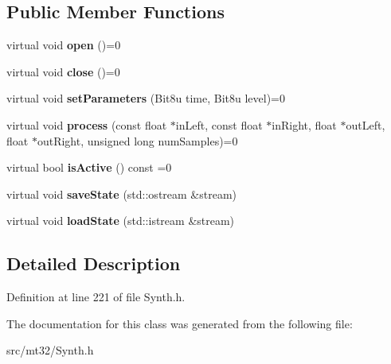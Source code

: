 \subsection*{Public Member Functions}
\begin{DoxyCompactItemize}
\item 
\hypertarget{classMT32Emu_1_1ReverbModel_aaa148cc0e88fc6bff6711e0f7d88f53f}{virtual void {\bfseries open} ()=0}\label{classMT32Emu_1_1ReverbModel_aaa148cc0e88fc6bff6711e0f7d88f53f}

\item 
\hypertarget{classMT32Emu_1_1ReverbModel_ac28466ba2693e477199460f4e8284a18}{virtual void {\bfseries close} ()=0}\label{classMT32Emu_1_1ReverbModel_ac28466ba2693e477199460f4e8284a18}

\item 
\hypertarget{classMT32Emu_1_1ReverbModel_a93c9359642d5af0d12919a9c401cd45b}{virtual void {\bfseries set\-Parameters} (Bit8u time, Bit8u level)=0}\label{classMT32Emu_1_1ReverbModel_a93c9359642d5af0d12919a9c401cd45b}

\item 
\hypertarget{classMT32Emu_1_1ReverbModel_ac60ff1ce2509fe736e1ec16ce0ffd680}{virtual void {\bfseries process} (const float $\ast$in\-Left, const float $\ast$in\-Right, float $\ast$out\-Left, float $\ast$out\-Right, unsigned long num\-Samples)=0}\label{classMT32Emu_1_1ReverbModel_ac60ff1ce2509fe736e1ec16ce0ffd680}

\item 
\hypertarget{classMT32Emu_1_1ReverbModel_ad6c595a6e30a9110cb3584339f734bec}{virtual bool {\bfseries is\-Active} () const =0}\label{classMT32Emu_1_1ReverbModel_ad6c595a6e30a9110cb3584339f734bec}

\item 
\hypertarget{classMT32Emu_1_1ReverbModel_ad8de8fb0e2084e478e6ee186dd4f74fb}{virtual void {\bfseries save\-State} (std\-::ostream \&stream)}\label{classMT32Emu_1_1ReverbModel_ad8de8fb0e2084e478e6ee186dd4f74fb}

\item 
\hypertarget{classMT32Emu_1_1ReverbModel_a51a50525962c7dc1687f11b40d268df4}{virtual void {\bfseries load\-State} (std\-::istream \&stream)}\label{classMT32Emu_1_1ReverbModel_a51a50525962c7dc1687f11b40d268df4}

\end{DoxyCompactItemize}


\subsection{Detailed Description}


Definition at line 221 of file Synth.\-h.



The documentation for this class was generated from the following file\-:\begin{DoxyCompactItemize}
\item 
src/mt32/Synth.\-h\end{DoxyCompactItemize}
